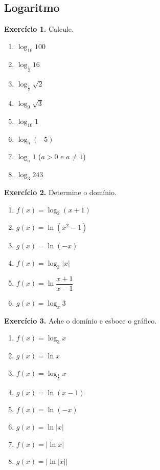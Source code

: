 \documentclass[12pt,a4paper]{article}
\begin{document}
\subsection{Logaritmo}
\vspace{0.5cm}
\noindent\textbf{Exercício 1.} Calcule.
\begin{enumerate}
    \renewcommand{\theenumi}{\alph{enumi}}
    \renewcommand{\labelenumi}{\theenumi)}
    \item $\log_{10} 100$
    \item $\log_{\frac{1}{2}} 16$
    \item $\log_{\frac{1}{2}} \sqrt{2}$
    \item $\log_9 \sqrt{3}$
    \item $\log_{10} 1$
    \item $\log_5 (-5)$
    \item $\log_a 1$ ($a > 0$ e $a \neq 1$)
    \item $\log_3 243$
\end{enumerate}

\vspace{0.5cm}
\noindent\textbf{Exercício 2.} Determine o domínio.
\begin{enumerate}
    \renewcommand{\theenumi}{\alph{enumi}}
    \renewcommand{\labelenumi}{\theenumi)}
    \item $f(x) = \log_2 (x + 1)$
    \item $g(x) = \ln(x^2 - 1)$
    \item $g(x) = \ln(-x)$
    \item $f(x) = \log_3 |x|$
    \item $f(x) = \ln\dfrac{x + 1}{x - 1}$
    \item $g(x) = \log_x 3$
\end{enumerate}

\vspace{0.5cm}
\noindent\textbf{Exercício 3.} Ache o domínio e esboce o gráfico.
\begin{enumerate}
    \renewcommand{\theenumi}{\alph{enumi}}
    \renewcommand{\labelenumi}{\theenumi)}
    \item $f(x) = \log_3 x$
    \item $g(x) = \ln x$
    \item $f(x) = \log_{\frac{1}{3}} x$
    \item $g(x) = \ln(x - 1)$
    \item $f(x) = \ln(-x)$
    \item $g(x) = \ln |x|$
    \item $f(x) = |\ln x|$
    \item $g(x) = |\ln |x||$
\end{enumerate}
\end{document}
